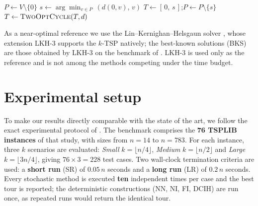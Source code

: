 \begin{algorithm}[t]
\DontPrintSemicolon
{}
$P \leftarrow V\setminus\{0\}$\;
$s \leftarrow \arg\min_{v\in P}\,(d(0,v),\,v)$ 
$T \leftarrow [\,0,\,s\,]$;\quad $P\leftarrow P\setminus\{s\}$\;
$T \leftarrow \textsc{TwoOptCycle}(T,d)$\;
\;
\caption{DCIH for the $k$-TSP}\label{alg:dci}
\end{algorithm}

As a near-optimal reference we use the Lin--Kernighan--Helsgaun solver
\citep{Helsgaun,lin1973}, whose extension LKH-3 \citep{helsgaun2017lkh3} supports
the $k$-TSP natively; the best-known solutions (BKS) are those obtained by LKH-3 on
the benchmark of \citet{pandiri2020}. LKH-3 is used only as the reference and is
not among the methods competing under the time budget.

\section{Experimental setup}\label{sec:setup}

To make our results directly comparable with the state of the art, we follow the
exact experimental protocol of \citet{pandiri2020}. The benchmark comprises the
\textbf{76 TSPLIB instances} \citep{TSPLIB} of that study, with sizes from $n=14$
to $n=783$. For each instance, three $k$ scenarios are evaluated: \emph{Small}
$k=\lfloor n/4\rfloor$, \emph{Medium} $k=\lfloor n/2\rfloor$ and \emph{Large}
$k=\lfloor 3n/4\rfloor$, giving $76\times 3 = 228$ test cases. Two wall-clock
termination criteria are used: a \textbf{short run} (SR) of $0.05\,n$ seconds and a
\textbf{long run} (LR) of $0.2\,n$ seconds. Every stochastic method is executed
\textbf{ten} independent times per case and the best tour is reported; the
deterministic constructions (NN, NI, FI, DCIH) are run once, as repeated runs would
return the identical tour.

